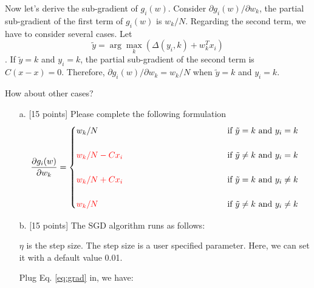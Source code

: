Now let's derive the sub-gradient of $g_i(w)$.
Consider $\partial g_i(w)/ \partial w_k$, the partial sub-gradient of the first term of $g_i(w)$ is $w_k/N$.
Regarding the second term, we have to consider several cases. 
Let $$\tilde{y} = \arg\max_k \left(\Delta(y_i, k)+w^T_k x_i\right)$$. If $\tilde{y} = k$ and $y_i = k$, the partial sub-gradient of the second term is $C(x - x) = 0$. Therefore, 
$\partial g_i(w)/ \partial w_k = w_k/N$ when $\tilde{y} = k$ and $y_i = k$. 

How about other cases?

\begin{enumerate}
\item [a.] {[15 points]} Please complete the following formulation
\begin{equation}
\label{eq:grad}
\frac{\partial g_i(w)}{\partial w_k} = \begin{cases}
w_k/N     \hspace{5cm} & \mbox{if } \tilde{y} = k \mbox{ and } y_i = k\\
\\
{\color{red} w_k/N -Cx_i}    &\mbox{if } \tilde{y} \neq k \mbox{ and } y_i = k\\
       \\
     {\color{red} w_k/N + Cx_i}    &\mbox{if } \tilde{y} = k \mbox{ and } y_i \neq k\\
       \\
        {\color{red} w_k/N}    &\mbox{if } \tilde{y} \neq k \mbox{ and } y_i \neq k\\
\end{cases}
\end{equation}




\item [b.]  {[15 points]} The SGD algorithm runs as follows:  

\begin{algorithmic}
\STATE {}
\ENDFOR
\ENDFOR
\ENDFOR
\end{algorithmic}
$\eta$ is the step size. The step size is a user specified parameter. Here, we can set it with a default value 0.01.


Plug Eq. \eqref{eq:grad} in, we have:
\begin{algorithmic}
\STATE {}
\STATE
   

\end{algorithmic}
\end{enumerate}
